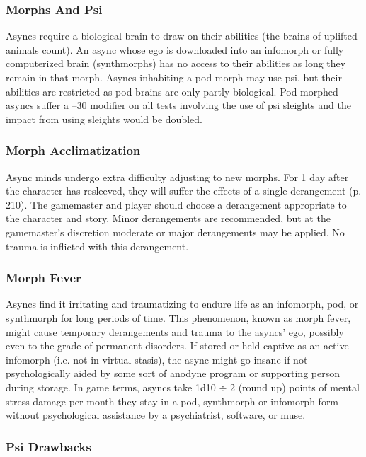 \subsubsection{Morphs And Psi} 

Asyncs require a biological brain to draw on their abilities (the brains of uplifted animals count). An async whose ego is downloaded into an infomorph or fully computerized brain (synthmorphs) has no access to their abilities as long they remain in that morph. Asyncs inhabiting a pod morph may use psi, but their abilities are restricted as pod brains are only partly biological. Pod-morphed asyncs suffer a –30 modifier on all tests involving the use of psi sleights and the impact from using sleights would be doubled. 

\subsubsection{Morph Acclimatization} 

Async minds undergo extra difficulty adjusting to new morphs. For 1 day after the character has resleeved, they will suffer the effects of a single derangement (p. 210). The gamemaster and player should choose a derangement appropriate to the character and story. Minor derangements are recommended, but at the gamemaster’s discretion moderate or major derangements may be applied. No trauma is inflicted with this derangement. 

\subsubsection{Morph Fever} 

Asyncs find it irritating and traumatizing to endure life as an infomorph, pod, or synthmorph for long periods of time. This phenomenon, known as morph fever, might cause temporary derangements and trauma to the asyncs’ ego, possibly even to the grade of permanent disorders. If stored or held captive as an active infomorph (i.e. not in virtual stasis), the async might go insane if not psychologically aided by some sort of anodyne program or supporting person during storage. In game terms, asyncs take 1d10 $\div$ 2 (round up) points of mental stress damage per month they stay in a pod, synthmorph or infomorph form without psychological assistance by a psychiatrist, software, or muse. 

\subsubsection{Psi Drawbacks} 

